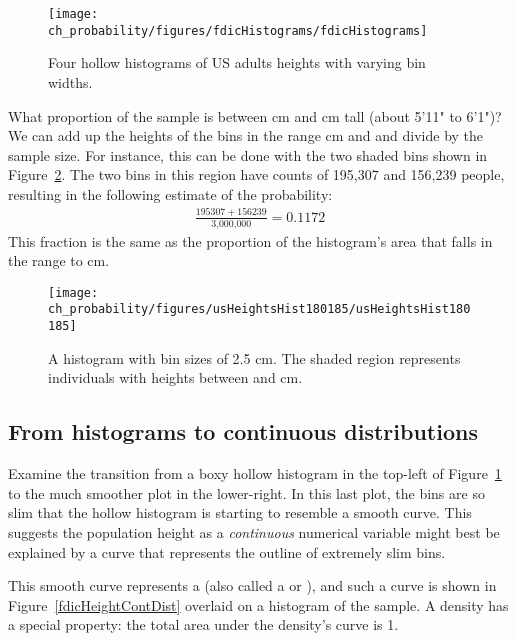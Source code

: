\begin{figure}[ht]
\centering
\texttt{[image: ch\_probability/figures/fdicHistograms/fdicHistograms]}
\caption{Four hollow histograms of US adults heights with varying bin widths.}
\label{fdicHistograms}
\end{figure}

\begin{example}{What proportion of the sample is between  cm and  cm tall (about 5'11" to 6'1")?}\label{contDistProb}
We can add up the heights of the bins in the range  cm and  and divide by the sample size. For instance, this can be done with the two shaded bins shown in Figure~\ref{usHeightsHist180185}. The two bins in this region have counts of 195,307 and 156,239 people, resulting in the following estimate of the probability:
\begin{eqnarray*}
\frac{195307+156239}{\text{3,000,000}} = 0.1172
\end{eqnarray*}
This fraction is the same as the proportion of the histogram's area that falls in the range  to  cm.
\end{example}

\begin{figure}
\centering
\texttt{[image: ch\_probability/figures/usHeightsHist180185/usHeightsHist180185]}
\caption{A histogram with bin sizes of 2.5 cm. The shaded region represents individuals with heights between  and  cm.}
\label{usHeightsHist180185}
\end{figure}

\subsection{From histograms to continuous distributions}

Examine the transition from a boxy hollow histogram in the top-left of Figure~\ref{fdicHistograms} to the much smoother plot in the lower-right. In this last plot, the bins are so slim that the hollow histogram is starting to resemble a smooth curve. This suggests the population height as a \emph{continuous} numerical variable might best be explained by a curve that represents the outline of extremely slim bins.

This smooth curve represents a  (also called a  or ), and such a curve is shown in Figure~\ref{fdicHeightContDist} overlaid on a histogram of the sample. A density has a special property: the total area under the density's curve is 1.

